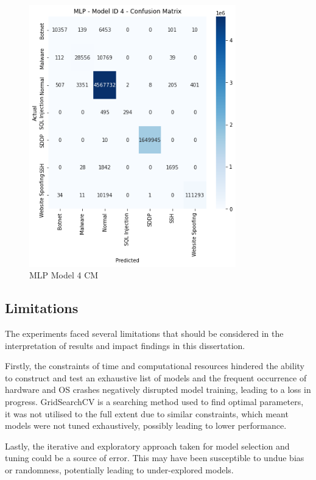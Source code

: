 \begin{figure}[H]
    \centering
	\includegraphics[width=0.8\textwidth]{Appendices/Images/MLP/MLP_Model4_CM.png}
	\caption{MLP Model 4 CM}
  	\label{fig:mlp_model4_cm}
\end{figure}

\subsection{Limitations}

The experiments faced several limitations that should be considered in the interpretation of results and impact findings in this dissertation. 

Firstly, the constraints of time and computational resources hindered the ability to construct and test an exhaustive list of models and the frequent occurrence of hardware and OS crashes negatively disrupted model training, leading to a loss in progress. 
GridSearchCV is a searching method used to find optimal parameters, it was not utilised to the full extent due to similar constraints, which meant models were not tuned exhaustively, possibly leading to lower performance.

Lastly, the iterative and exploratory approach taken for model selection and tuning could be a source of error. This may have been susceptible to undue bias or randomness, potentially leading to under-explored models. 

